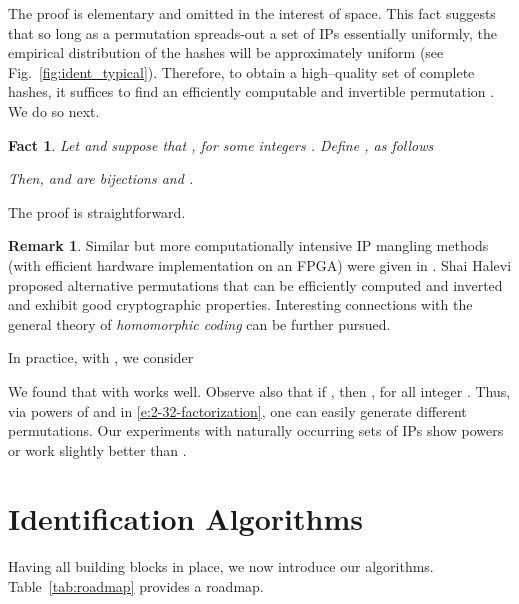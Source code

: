 \documentclass[10pt, conference, letterpaper,onecolumn]{IEEEtranv1.8}
\theoremstyle{plain}\newtheorem{thm}{Theorem}\newtheorem{lem}{Lemma}
\newtheorem{fact}{Fact}
\theoremstyle{definition}
\newtheorem{rem}{Remark}
\begin{document}
\noindent The proof is elementary and omitted in the interest of space. This fact suggests that so long as a permutation  spreads-out 
a set of IPs essentially uniformly, the empirical distribution of the hashes  will be approximately uniform (see Fig.~\ref{fig:ident_typical}).
Therefore, to obtain a high--quality set of complete hashes, it suffices to find an efficiently computable and invertible permutation . 
We do so next.

\begin{fact} \label{f:RSA} Let  and suppose that , for some integers 
. Define , as follows

Then,   and  are bijections and .
\end{fact}

\noindent 
The proof is straightforward. 

\begin{rem}Similar but more computationally intensive IP mangling methods (with efficient hardware 
implementation on an FPGA) were given in \cite{4146856}. Shai Halevi \cite{halevi:2007} proposed 
alternative permutations that can be efficiently computed and inverted and exhibit good cryptographic
properties. Interesting connections with the general theory of {\em homomorphic coding} can be further pursued. 
\end{rem}



In practice, with , we consider 

We found that  with  works well. Observe also that if , then , 
for all integer . Thus, via powers of  and  in \eqref{e:2-32-factorization}, one can easily generate different permutations. 
Our experiments with naturally occurring sets of IPs show powers  or  work slightly better than .




\section{Identification Algorithms}
\label{sec:identification}

Having all  building blocks in place, we now introduce our algorithms. Table~\ref{tab:roadmap} provides a roadmap.
\end{document}
